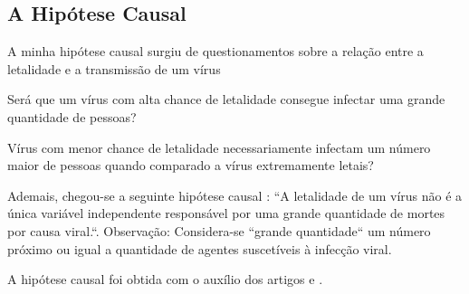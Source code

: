 \subsection{A Hipótese Causal}

A minha hipótese causal surgiu de questionamentos sobre a relação entre a letalidade e a transmissão de um vírus

\begin{description}
\item Será que um vírus com alta chance de letalidade consegue infectar uma grande quantidade de pessoas? 
\item Vírus com menor chance de letalidade necessariamente infectam um número maior de pessoas quando comparado a vírus extremamente letais?
\end{description}

Ademais, chegou-se a seguinte hipótese causal : ``A letalidade de um vírus não é a única variável independente responsável por uma grande quantidade de mortes por causa viral.``. 
Observação: Considera-se ``grande quantidade`` um número próximo ou igual a quantidade de agentes suscetíveis à infecção viral.

A hipótese causal foi obtida com o auxílio dos artigos \cite{geoghegan_virological_2016} e \cite{belay_low-incidence_2014}.






